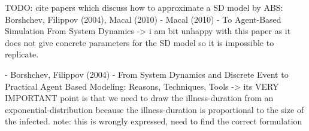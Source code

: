 TODO: cite papers which discuss how to approximate a SD model by ABS: Borshchev, Filippov (2004), Macal (2010)
- Macal (2010) - To Agent-Based Simulation From System Dynamics 
	-> i am bit unhappy with this paper as it does not give concrete parameters for the SD model so it is impossible to replicate. 

- Borshchev, Filippov (2004) - From System Dynamics and Discrete Event to Practical Agent Based Modeling: Reasons, Techniques, Tools
	-> its VERY IMPORTANT point is that we need to draw the illness-duration from an exponential-distribution because the illness-duration is proportional to the size of the infected. note: this is wrongly expressed, need to find the correct formulation